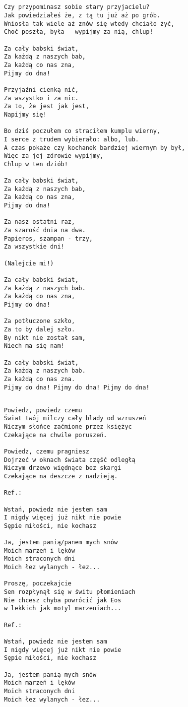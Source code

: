 \documentclass[12pt]{article}
\begin{document}
\subsection*{}
\begin{verbatim}
Czy przypominasz sobie stary przyjacielu?
Jak powiedziałeś że, z tą tu już aż po grób.
Wniosła tak wiele aż znów się wtedy chciało żyć,
Choć poszła, była - wypijmy za nią, chlup!

Za cały babski świat,
Za każdą z naszych bab,
Za każdą co nas zna,
Pijmy do dna!

Przyjaźni cienką nić,
Za wszystko i za nic.
Za to, że jest jak jest,
Napijmy się!

Bo dziś poczułem co straciłem kumplu wierny,
I serce z trudem wybierało: albo, lub.
A czas pokaże czy kochanek bardziej wiernym by był,
Więc za jej zdrowie wypijmy,
Chlup w ten dziób!

Za cały babski świat,
Za każdą z naszych bab,
Za każdą co nas zna,
Pijmy do dna!

Za nasz ostatni raz,
Za szarość dnia na dwa.
Papieros, szampan - trzy,
Za wszystkie dni!

(Nalejcie mi!)

Za cały babski świat,
Za każdą z naszych bab.
Za każdą co nas zna,
Pijmy do dna!

Za potłuczone szkło,
Za to by dalej szło.
By nikt nie został sam,
Niech ma się nam!

Za cały babski świat,
Za każdą z naszych bab.
Za każdą co nas zna.
Pijmy do dna! Pijmy do dna! Pijmy do dna! 
\end{verbatim}
\clearpage

\subsection*{}
\begin{verbatim}
Powiedz, powiedz czemu
Świat twój milczy cały blady od wzruszeń
Niczym słońce zaćmione przez księżyc
Czekające na chwile poruszeń.

Powiedz, czemu pragniesz
Dojrzeć w oknach świata część odległą
Niczym drzewo więdnące bez skargi
Czekające na deszcze z nadzieją.

Ref.:

Wstań, powiedz nie jestem sam
I nigdy więcej już nikt nie powie
Sępie miłości, nie kochasz

Ja, jestem panią/panem mych snów
Moich marzeń i lęków
Moich straconych dni
Moich łez wylanych - łez...

Proszę, poczekajcie
Sen rozpłynął się w świtu płomieniach
Nie chcesz chyba powrócić jak Eos
w lekkich jak motyl marzeniach...

Ref.:

Wstań, powiedz nie jestem sam
I nigdy więcej już nikt nie powie
Sępie miłości, nie kochasz

Ja, jestem panią mych snów
Moich marzeń i lęków
Moich straconych dni
Moich łez wylanych - łez...
\end{verbatim}
\clearpage
\end{document}
